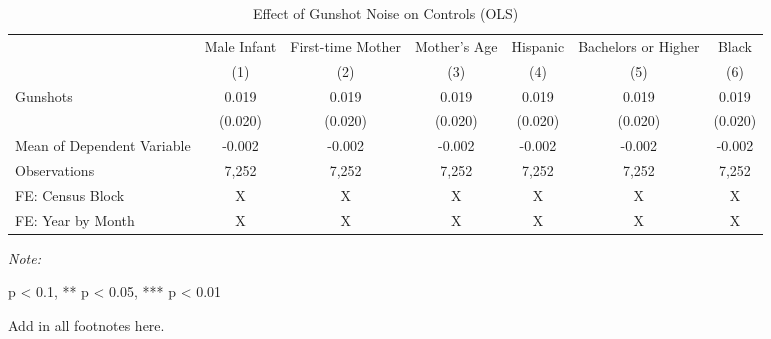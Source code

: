 \begin{table}[H]
\centering
\caption{\label{control_table}Effect of Gunshot Noise on Controls (OLS)}
\centering
\begin{threeparttable}
\fontsize{11}{13}\selectfont
\begin{tabular}[t]{>{\raggedright\arraybackslash}p{5cm}cccccc}
\toprule
\multicolumn{1}{c}{ } & \multicolumn{1}{c}{Male Infant} & \multicolumn{1}{c}{First-time Mother} & \multicolumn{1}{c}{Mother's Age} & \multicolumn{1}{c}{Hispanic} & \multicolumn{1}{c}{Bachelors or Higher} & \multicolumn{1}{c}{Black} \\
\cmidrule(l{3pt}r{3pt}){2-2} \cmidrule(l{3pt}r{3pt}){3-3} \cmidrule(l{3pt}r{3pt}){4-4} \cmidrule(l{3pt}r{3pt}){5-5} \cmidrule(l{3pt}r{3pt}){6-6} \cmidrule(l{3pt}r{3pt}){7-7}
  & (1) & (2) & (3) & (4) & (5) & (6)\\
\midrule
Gunshots & 0.019 & 0.019 & 0.019 & 0.019 & 0.019 & 0.019\\
 & (0.020) & (0.020) & (0.020) & (0.020) & (0.020) & (0.020)\\
Mean of Dependent Variable & -0.002 & -0.002 & -0.002 & -0.002 & -0.002 & -0.002\\
Observations & 7,252 & 7,252 & 7,252 & 7,252 & 7,252 & 7,252\\
FE: Census Block & X & X & X & X & X & X\\
\addlinespace
FE: Year by Month & X & X & X & X & X & X\\
\bottomrule
\end{tabular}
\begin{tablenotes}
\item \textit{Note: } 
\item * p < 0.1, ** p < 0.05, *** p < 0.01
\item Add in all footnotes here.
\end{tablenotes}
\end{threeparttable}
\end{table}
